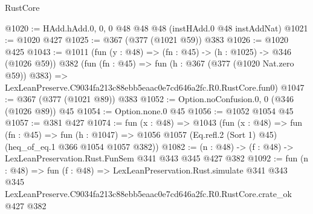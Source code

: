 \begin{lexlean}{RustCore}
\begin{coremodule}
@1020 := HAdd.hAdd.{0, 0, 0} @48 @48 @48 (instHAdd.{0} @48 instAddNat)
@1021 := @1020 @427
@1025 := @367 (@377 (@1021 @59)) @383
@1026 := @1020 @425
@1043 := @1011
    (fun (y : @48) => (fn : @45) -> (h : @1025) -> @346 (@1026 @59))
    @382
    (fun (fn : @45) =>
    fun (h : @367 (@377 (@1020 Nat.zero @59)) @383) =>
    LexLeanPreserve.C9034fa213c88ebb5eaac0e7cd646a2fc.R0.RustCore.fun0)
@1047 := @367 (@377 (@1021 @89)) @383
@1052 := Option.noConfusion.{0, 0} (@346 (@1026 @89)) @45
@1054 := Option.none.{0} @45
@1056 := @1052 @1054 @45
@1057 := @381 @427
@1074 := fun (x : @48) =>
  @1043
    (fun (x : @48) =>
    fun (fn : @45) =>
    fun (h : @1047) => @1056 @1057 (Eq.refl.{2} (Sort 1) @45) (heq_of_eq.{1} @366 @1054 @1057 @382))
@1082 := (n : @48) -> (f : @48) -> LexLeanPreservation.Rust.FunSem @341 @343 @345 @427 @382
@1092 := fun (n : @48) =>
  fun (f : @48) =>
  LexLeanPreservation.Rust.simulate
    @341
    @343
    @345
    LexLeanPreserve.C9034fa213c88ebb5eaac0e7cd646a2fc.R0.RustCore.crate_ok
    @427
    @382
\end{coremodule}
\end{lexlean}
